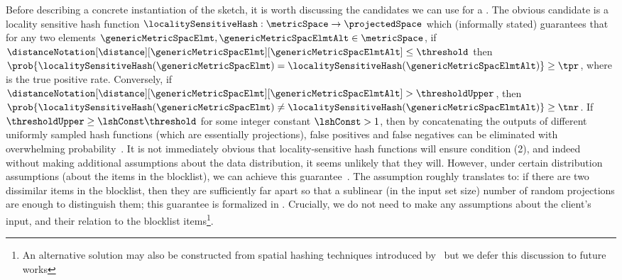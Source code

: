 %
Before describing a concrete instantiation of the sketch, it 
is worth discussing the candidates we can use for a \projectionPrimitive.
The obvious candidate is a locality sensitive hash function $\localitySensitiveHash: \metricSpace 
\rightarrow \projectedSpace$ which (informally stated) guarantees that for any two elements 
$\genericMetricSpacElmt, \genericMetricSpacElmtAlt \in 
\metricSpace$, if 
$\distanceNotation[\distance][\genericMetricSpacElmt][\genericMetricSpacElmtAlt] \le \threshold$ 
then $\prob{\localitySensitiveHash(\genericMetricSpacElmt) = 
	\localitySensitiveHash(\genericMetricSpacElmtAlt)} \ge \tpr$, where \tpr is the true positive rate. 
Conversely, if 
$\distanceNotation[\distance][\genericMetricSpacElmt][\genericMetricSpacElmtAlt] > 
\thresholdUpper$, then $\prob{\localitySensitiveHash(\genericMetricSpacElmt) \neq
	\localitySensitiveHash(\genericMetricSpacElmtAlt)} \ge \tnr$. If $\thresholdUpper \ge 
\lshConst \threshold$ for some integer constant $\lshConst > 1$, then by concatenating the 
outputs of \numProjections different uniformly sampled hash functions (which are essentially 
projections), false positives and false 
negatives can be eliminated with overwhelming probability~\cite{}.
It is not immediately obvious that locality-sensitive hash functions will ensure condition (2), 
and indeed without making additional assumptions about the data distribution, it
seems unlikely that they will. However, under certain distribution assumptions (about the items in 
the blocklist), we can achieve this guarantee~\cite{chongchitmate2024approximate}. The 
assumption roughly translates to: if there are two dissimilar items in the blocklist, then they are 
sufficiently far apart so that a sublinear (in the input set size) number of random projections are 
enough to distinguish them; this guarantee is formalized in \secref{}. Crucially, we do not need to 
make any assumptions about the client's input, and their relation to the blocklist items\footnote{An 
	alternative solution may also be constructed from spatial hashing techniques introduced 
	by~\citet{} 
	but we defer this discussion to future works}.

